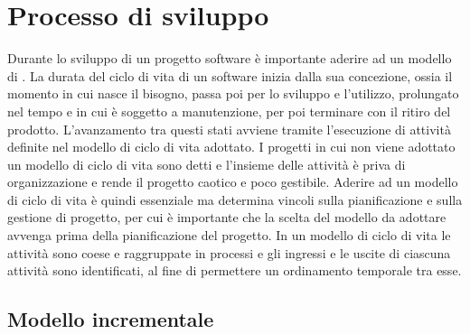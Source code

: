 
\chapter{Processo di sviluppo}
\label{cap:processi-metodologie}

Durante lo sviluppo di un progetto software è importante aderire ad un modello di . La durata del ciclo di vita di un software inizia dalla sua concezione, ossia il momento in cui nasce il bisogno, passa poi per lo sviluppo e l'utilizzo, prolungato nel tempo e in cui è soggetto a manutenzione, per poi terminare con il ritiro del prodotto. L'avanzamento tra questi stati avviene tramite l'esecuzione di attività definite nel modello di ciclo di vita adottato. I progetti in cui non viene adottato un modello di ciclo di vita sono detti  e l'insieme delle attività è priva di organizzazione e rende il progetto caotico e poco gestibile. Aderire ad un modello di ciclo di vita è quindi essenziale ma determina vincoli sulla pianificazione e sulla gestione di progetto, per cui è importante che la scelta del modello da adottare avvenga prima della pianificazione del progetto. In un modello di ciclo di vita le attività sono coese e raggruppate in processi e gli ingressi e le uscite di ciascuna attività sono identificati, al fine di permettere un ordinamento temporale tra esse.

\section{Modello incrementale}

